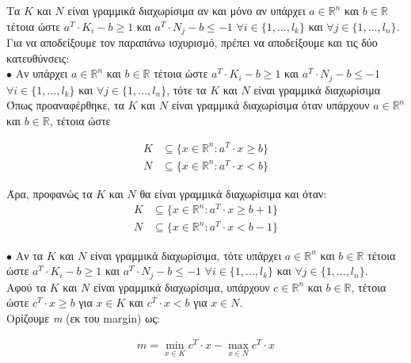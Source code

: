 \documentclass[12pt]{article}
\newcommand{\R}{\mathbb{R}}
\newcommand{\centered}[1]{\begin{align*}#1\end{align*}}
\begin{document}
Τα \(K\) και \(N\) είναι γραμμικά διαχωρίσιμα αν και μόνο αν υπάρχει \(a \in \R^{n}\) και \(b \in \R\) τέτοια ώστε \(a^{T} \cdot K_{i} -b \geq 1\) και \(a^{T} \cdot N_{j} - b \leq -1\) \(\forall i \in \{1,...,l_{k}\}\) και \(\forall j \in \{1,...,l_{n}\}\). \\

Για να αποδείξουμε τον παραπάνω ισχυρισμό, πρέπει να αποδείξουμε και τις δύο κατευθύνσεις: \\

\( \bullet \) Αν υπάρχει \(a \in \R^{n}\) και \(b \in \R\) τέτοια ώστε \(a^{T} \cdot K_{i} -b \geq 1\) και \(a^{T} \cdot N_{j} - b \leq -1\) \(\forall i \in \{1,...,l_{k}\}\) και \(\forall j \in \{1,...,l_{n}\}\), τότε τα \(K\) και \(N\) είναι γραμμικά διαχωρίσιμα \\

Όπως προαναφέρθηκε, τα \(K\) και \(N\) είναι γραμμικά διαχωρίσιμα όταν υπάρχουν \( a \in \R^{n} \) και \( b \in \R \), τέτοια ώστε

\begin{align*}
K & \subseteq \{ x \in \R^{n} : a^{T} \cdot x \geq b \} \\
N & \subseteq \{ x \in \R^{n} : a^{T} \cdot x < b\}
\end{align*}

Άρα, προφανώς τα \(K\) και \(N\) θα είναι γραμμικά διαχωρίσιμα και όταν: \\

\begin{align*}
K & \subseteq \{ x \in \R^{n} : a^{T} \cdot x \geq b + 1 \} \\
N & \subseteq \{ x \in \R^{n} : a^{T} \cdot x < b - 1\}
\end{align*}

\( \bullet \)  Αν τα \(K\) και \(N\) είναι γραμμικά διαχωρίσιμα, τότε υπάρχει \(a \in \R^{n}\) και \(b \in \R\) τέτοια ώστε \(a^{T} \cdot K_{i} -b \geq 1\) και \(a^{T} \cdot N_{j} - b \leq -1\) \(\forall i \in \{1,...,l_{k}\}\) και \(\forall j \in \{1,...,l_{n}\}\). \\

Αφού τα \(K\) και \(N\) είναι γραμμικά διαχωρίσιμα, υπάρχουν \( c \in \R^{n} \) και \( b \in \R \), τέτοια ώστε \(c^{T} \cdot x \geq b \) για \(x \in K\) και \(c^{T} \cdot x < b \) για \(x \in Ν\). \\

Ορίζουμε \textit{m} (εκ του margin) ως:

\centered{ m = \min_{x \in K} c^{T} \cdot x - \max_{x \in N} c^{T} \cdot x }
\end{document}
